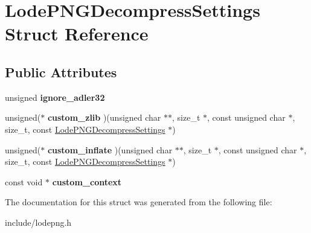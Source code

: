 \hypertarget{struct_lode_p_n_g_decompress_settings}{}\section{Lode\+P\+N\+G\+Decompress\+Settings Struct Reference}
\label{struct_lode_p_n_g_decompress_settings}
\subsection*{Public Attributes}
\begin{DoxyCompactItemize}
\item 
unsigned {\bfseries ignore\+\_\+adler32}\hypertarget{struct_lode_p_n_g_decompress_settings_afab4b919650b51b4d2f175a60ed6c580}{}\label{struct_lode_p_n_g_decompress_settings_afab4b919650b51b4d2f175a60ed6c580}

\item 
unsigned($\ast$ {\bfseries custom\+\_\+zlib} )(unsigned char $\ast$$\ast$, size\+\_\+t $\ast$, const unsigned char $\ast$, size\+\_\+t, const \hyperlink{struct_lode_p_n_g_decompress_settings}{Lode\+P\+N\+G\+Decompress\+Settings} $\ast$)\hypertarget{struct_lode_p_n_g_decompress_settings_a9dd432e46330dbd2ce3ef1929c64337d}{}\label{struct_lode_p_n_g_decompress_settings_a9dd432e46330dbd2ce3ef1929c64337d}

\item 
unsigned($\ast$ {\bfseries custom\+\_\+inflate} )(unsigned char $\ast$$\ast$, size\+\_\+t $\ast$, const unsigned char $\ast$, size\+\_\+t, const \hyperlink{struct_lode_p_n_g_decompress_settings}{Lode\+P\+N\+G\+Decompress\+Settings} $\ast$)\hypertarget{struct_lode_p_n_g_decompress_settings_a023aa5946c99934d40280850a4d8b204}{}\label{struct_lode_p_n_g_decompress_settings_a023aa5946c99934d40280850a4d8b204}

\item 
const void $\ast$ {\bfseries custom\+\_\+context}\hypertarget{struct_lode_p_n_g_decompress_settings_a66e3608b541c64bb275c0ac1a80c3ec6}{}\label{struct_lode_p_n_g_decompress_settings_a66e3608b541c64bb275c0ac1a80c3ec6}

\end{DoxyCompactItemize}


The documentation for this struct was generated from the following file\+:\begin{DoxyCompactItemize}
\item 
include/lodepng.\+h\end{DoxyCompactItemize}
